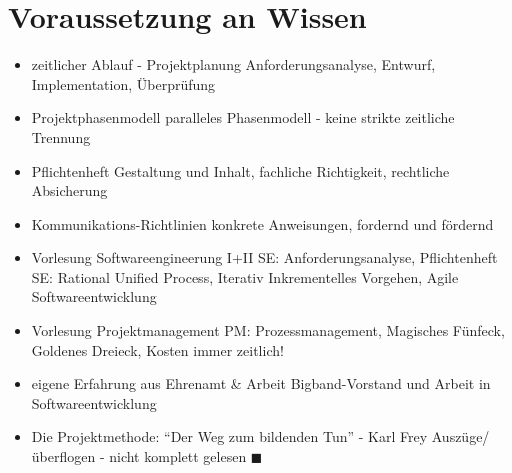 \documentclass[ignorenonframetext, 11pt, table]{beamer}
\begin{document}
\section{Voraussetzung an Wissen}
\begin{frame}
	\begin{itemize}
		\item<2-> zeitlicher Ablauf - Projektplanung
			 {Anforderungsanalyse, Entwurf, Implementation, Überprüfung}
		\item<3-> Projektphasenmodell
			 {paralleles Phasenmodell - keine strikte zeitliche Trennung}
		\item<4-> Pflichtenheft
			 {Gestaltung und Inhalt, fachliche Richtigkeit, rechtliche Absicherung}
		\item<5-> Kommunikations-Richtlinien
			 {konkrete Anweisungen, fordernd und fördernd}
	\end{itemize}
	\begin{itemize}
		\item<7-> Vorlesung Softwareengineerung I+II
			 {SE: Anforderungsanalyse, Pflichtenheft}
			 {SE: Rational Unified Process, Iterativ Inkrementelles Vorgehen, Agile Softwareentwicklung}
		\item<8-> Vorlesung Projektmanagement
			 {PM: Prozessmanagement, Magisches Fünfeck, Goldenes Dreieck, Kosten immer zeitlich!}
		\item<9-> eigene Erfahrung aus Ehrenamt \& Arbeit
			 {Bigband-Vorstand und Arbeit in Softwareentwicklung}
		\item<10-> Die Projektmethode: "`Der Weg zum bildenden Tun"' - Karl Frey
			 {Auszüge/überflogen - nicht komplett gelesen $\blacksquare$}
	\end{itemize}
\end{frame}
\end{document}
